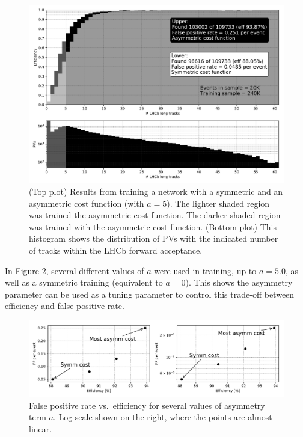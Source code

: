 \documentclass[a4paper]{jpconf}
\begin{document}
\begin{figure}
	\centering
	\includegraphics[width=\textwidth]{images/effntrackspaper.pdf}
	\caption{
		(Top plot) Results from training a network with a symmetric and an asymmetric cost function (with $a=5$).
		The lighter shaded region was trained the asymmetric cost function. The darker shaded region was trained with the asymmetric cost function.
		(Bottom plot) This histogram shows the distribution of PVs with the indicated number of tracks within the LHCb forward acceptance.
	}
    \label{fig:results}
\end{figure}

In Figure \ref{fig:efffp}, several different values of $a$ were used in training, up to $a=5.0$, as well as a symmetric training (equivalent to $a=0$). This shows the asymmetry parameter can be used as a tuning parameter to control this trade-off between efficiency and false positive rate.

\begin{figure}
	\centering
	\includegraphics[width=.8\textwidth]{images/EffVsFP2paper.pdf}
	\caption{False positive rate vs.\ efficiency for several values of asymmetry term $a$. Log scale shown on the right, where the points are almost linear.}
	\label{fig:efffp}
\end{figure}
\end{document}
